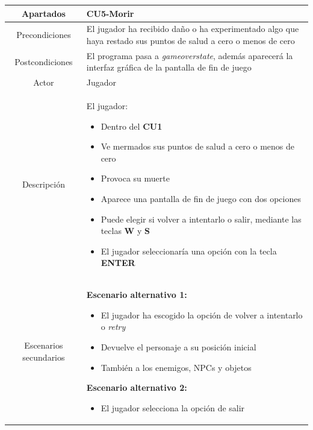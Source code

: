 \documentclass[a4paper]{article}
\begin{document}
\begin{table}[!ht]
    \centering
    \begin{tabular}{|c|p{12cm}|}
        \hline
        \textbf{Apartados}     & \textbf{CU5-Morir}                                                                                              \\
        \hline
        Precondiciones         & El jugador ha recibido daño o ha experimentado algo que haya restado sus puntos de salud a cero o menos de cero \\
        \hline
        Postcondiciones        & El programa pasa a \textit{gameoverstate}, además aparecerá la interfaz gráfica de la pantalla de fin de juego  \\
        \hline
        Actor                  & Jugador                                                                                                         \\
        \hline
        Descripción            & El jugador:
        \begin{itemize}
            \item Dentro del \textbf{CU1}
            \item Ve mermados sus puntos de salud a cero o menos de cero
            \item[\faAngleRight] Provoca su muerte
            \item[\faAngleRight] Aparece una pantalla de fin de juego con dos opciones
            \item Puede elegir si volver a intentarlo o salir, mediante las teclas \textbf{W} y \textbf{S}
            \item El jugador seleccionaría una opción con la tecla \textbf{ENTER}
        \end{itemize}                                            \\
        \hline
        Escenarios secundarios & \textbf{Escenario alternativo 1:}
        \begin{itemize}
            \item El jugador ha escogido la opción de volver a intentarlo o \textit{retry}
            \item Devuelve el personaje a su posición inicial
            \item También a los enemigos, NPCs y objetos
        \end{itemize}
        \textbf{Escenario alternativo 2:}
        \begin{itemize}
            \item El jugador selecciona la opción de salir

\end{itemize}
\end{tabular}
\end{table}
\end{document}
